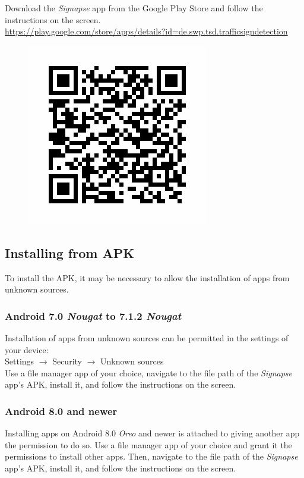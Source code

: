 \documentclass[12pt,a4paper,english,enabledeprecatedfontcommands]{article}
\begin{document}
Download the \textit{Signapse} app from the Google Play Store and follow the instructions on the screen.\\
\url{https://play.google.com/store/apps/details?id=de.swp.tsd.trafficsigndetection}

\begin{figure}[H]
\centering
\includegraphics[width=0.5\linewidth]{Benutzerhandbuch/qrcode.png}
\end{figure}



\subsection{Installing from APK}

To install the APK, it may be necessary to allow the installation of apps from unknown sources. 

\subsubsection{Android 7.0 \textit{Nougat} to 7.1.2 \textit{Nougat}}
Installation of apps from unknown sources can be permitted in the settings of your device:\\
Settings $\rightarrow$ Security $\rightarrow$ Unknown sources\\
Use a file manager app of your choice, navigate to the file path of the \textit{Signapse} app's APK, install it, and follow the instructions on the screen.

\subsubsection{Android 8.0  and newer}
Installing apps on Android 8.0 \textit{Oreo} and newer is attached to giving another app the permission to do so. Use a file manager app of your choice and grant it the permissions to install other apps. Then, navigate to the file path of the \textit{Signapse} app's APK, install it, and follow the instructions on the screen.
\end{document}
